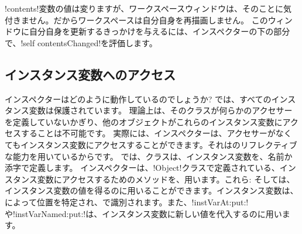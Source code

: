 \documentclass[a4paper,10pt,twoside]{book}
\begin{document}
\ct!contents!変数の値は変りますが、ワークスペースウィンドウは、そのことに気付きません。だからワークスペースは自分自身を再描画しません。
このウィンドウに自分自身を更新するきっかけを与えるには、インスペクターの下の部分で、\ct!self contentsChanged!を評価します。%

\subsection{インスタンス変数へのアクセス}

インスペクターはどのように動作しているのでしょうか?
\st{}では、すべてのインスタンス変数は保護されています。
理論上は、そのクラスが何らかのアクセサーを定義していないかぎり、他のオブジェクトがこれらのインスタンス変数にアクセスすることは不可能です。
実際には、インスペクターは、アクセサーがなくてもインスタンス変数にアクセスすることができます。それは\st{}のリフレクティブな能力を用いているからです。
\st{}では、クラスは、インスタンス変数を、名前か添字で定義します。
インスペクターは、\ct!Object!クラスで定義されている、インスタンス変数にアクセスするためのメソッドを、用います。これら: そしては、インスタンス変数の値を得るのに用いることができます。インスタンス変数は、によって位置を特定され、で識別されます。また、\ct!instVarAt:put:!や\ct!instVarNamed:put:!は、インスタンス変数に新しい値を代入するのに用います。%
\end{document}
